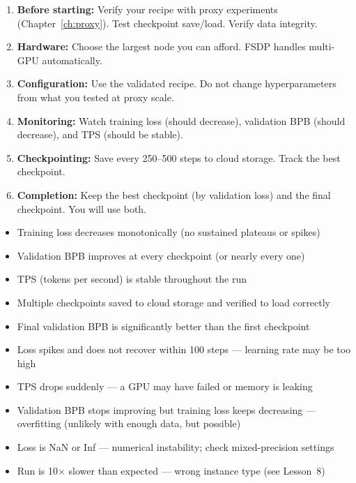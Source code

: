 \documentclass[11pt,a4paper]{article}
\begin{document}
\begin{enumerate}
    \item \textbf{Before starting:} Verify your recipe with proxy experiments (Chapter~\ref{ch:proxy}). Test checkpoint save/load. Verify data integrity.
    \item \textbf{Hardware:} Choose the largest node you can afford. FSDP handles multi-GPU automatically.
    \item \textbf{Configuration:} Use the validated recipe. Do not change hyperparameters from what you tested at proxy scale.
    \item \textbf{Monitoring:} Watch training loss (should decrease), validation BPB (should decrease), and TPS (should be stable).
    \item \textbf{Checkpointing:} Save every 250--500 steps to cloud storage. Track the best checkpoint.
    \item \textbf{Completion:} Keep the best checkpoint (by validation loss) and the final checkpoint. You will use both.
\end{enumerate}

\begin{successcheck}
\begin{itemize}[nosep]
  \item Training loss decreases monotonically (no sustained plateaus or spikes)
  \item Validation BPB improves at every checkpoint (or nearly every one)
  \item TPS (tokens per second) is stable throughout the run
  \item Multiple checkpoints saved to cloud storage and verified to load correctly
  \item Final validation BPB is significantly better than the first checkpoint
\end{itemize}
\end{successcheck}

\begin{failuresign}
\begin{itemize}[nosep]
  \item Loss spikes and does not recover within 100 steps --- learning rate may be too high
  \item TPS drops suddenly --- a GPU may have failed or memory is leaking
  \item Validation BPB stops improving but training loss keeps decreasing --- overfitting (unlikely with enough data, but possible)
  \item Loss is NaN or Inf --- numerical instability; check mixed-precision settings
  \item Run is 10$\times$ slower than expected --- wrong instance type (see Lesson~8)
\end{itemize}
\end{failuresign}
\end{document}
